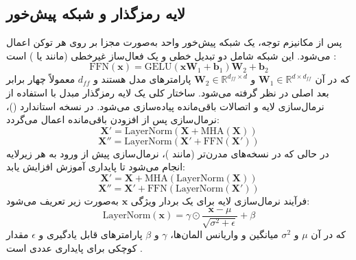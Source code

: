 \subsection{لایه رمزگذار و شبکه پیش‌خور}
پس از مکانیزم توجه، یک شبکه پیش‌خور واحد به‌صورت مجزا بر روی هر توکن اعمال می‌شود. این شبکه شامل دو تبدیل خطی و یک فعال‌ساز غیرخطی (مانند  یا ) است \cite{Vaswani2017}:
\begin{equation}
    \label{eq:ffn}
    \text{FFN}(\mathbf{x}) = \text{GELU}(\mathbf{x}\mathbf{W}_1 + \mathbf{b}_1)\mathbf{W}_2 + \mathbf{b}_2
\end{equation}
که در آن $\mathbf{W}_1 \in \mathbb{R}^{d \times d_{ff}}$ و $\mathbf{W}_2 \in \mathbb{R}^{d_{ff} \times d}$ پارامترهای مدل هستند و $d_{ff}$ معمولاً چهار برابر بعد اصلی در نظر گرفته می‌شود. ساختار کلی یک لایه رمزگذار مبدل با استفاده از نرمال‌سازی لایه و اتصالات باقی‌مانده پیاده‌سازی می‌شود. در نسخه استاندارد ()، نرمال‌سازی پس از افزودن باقی‌مانده اعمال می‌گردد:
\begin{equation}
    \mathbf{X}' = \text{LayerNorm}(\mathbf{X} + \text{MHA}(\mathbf{X}))
\end{equation}
\begin{equation}
    \mathbf{X}'' = \text{LayerNorm}(\mathbf{X}' + \text{FFN}(\mathbf{X}'))
\end{equation}
در حالی که در نسخه‌های مدرن‌تر (مانند )، نرمال‌سازی پیش از ورود به هر زیرلایه انجام می‌شود تا پایداری آموزش افزایش یابد:
\begin{equation}
    \mathbf{X}' = \mathbf{X} + \text{MHA}(\text{LayerNorm}(\mathbf{X}))
\end{equation}
\begin{equation}
    \mathbf{X}'' = \mathbf{X}' + \text{FFN}(\text{LayerNorm}(\mathbf{X}'))
\end{equation}
فرآیند نرمال‌سازی لایه برای یک بردار ویژگی $\mathbf{x}$ به‌صورت زیر تعریف می‌شود:
\begin{equation}
    \text{LayerNorm}(\mathbf{x}) = \gamma \odot \frac{\mathbf{x} - \mu}{\sqrt{\sigma^2 + \epsilon}} + \beta
\end{equation}
که در آن $\mu$ و $\sigma^2$ میانگین و واریانس المان‌ها، $\gamma$ و $\beta$ پارامترهای قابل یادگیری و $\epsilon$ مقدار کوچکی برای پایداری عددی است \cite{Vaswani2017}.

